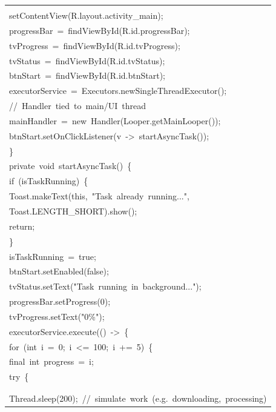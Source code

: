 \documentclass[a4paper,12pt]{article}
\begin{document}
\begin{longtable}{|p{}|}
\strut \\
{\ttfamily\small setContentView(R.layout.activity\_main);} \\
{\ttfamily\small progressBar\ =\ findViewById(R.id.progressBar);} \\
{\ttfamily\small tvProgress\ =\ findViewById(R.id.tvProgress);} \\
{\ttfamily\small tvStatus\ =\ findViewById(R.id.tvStatus);} \\
{\ttfamily\small btnStart\ =\ findViewById(R.id.btnStart);} \\
{\ttfamily\small executorService\ =\ Executors.newSingleThreadExecutor();} \\
{\ttfamily\small //\ Handler\ tied\ to\ main/UI\ thread} \\
{\ttfamily\small mainHandler\ =\ new\ Handler(Looper.getMainLooper());} \\
{\ttfamily\small btnStart.setOnClickListener(v\ -\textgreater{}\ startAsyncTask());} \\
{\ttfamily\small \}} \\
{\ttfamily\small private\ void\ startAsyncTask()\ \{} \\
{\ttfamily\small if\ (isTaskRunning)\ \{} \\
{\ttfamily\small Toast.makeText(this,\ "Task\ already\ running...",} \\
{\ttfamily\small Toast.LENGTH\_SHORT).show();} \\
{\ttfamily\small return;} \\
{\ttfamily\small \}} \\
{\ttfamily\small isTaskRunning\ =\ true;} \\
{\ttfamily\small btnStart.setEnabled(false);} \\
{\ttfamily\small tvStatus.setText("Task\ running\ in\ background...");} \\
{\ttfamily\small progressBar.setProgress(0);} \\
{\ttfamily\small tvProgress.setText("0\%");} \\
{\ttfamily\small executorService.execute(()\ -\textgreater{}\ \{} \\
{\ttfamily\small for\ (int\ i\ =\ 0;\ i\ \textless{}=\ 100;\ i\ +=\ 5)\ \{} \\
{\ttfamily\small final\ int\ progress\ =\ i;} \\
{\ttfamily\small try\ \{} \\
\strut \\
\strut \\
{\ttfamily\small Thread.sleep(200);\ //\ simulate\ work\ (e.g.\ downloading,\ processing)} \\

\end{longtable}
\end{document}
